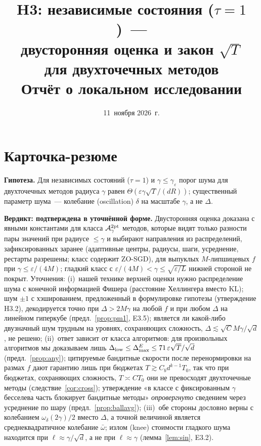 \documentclass[11pt,a4paper]{article}
\title{\textbf{H3: независимые состояния ($\tau=1$)~---\\ двусторонняя оценка и закон $\sqrt T$\\ для двухточечных методов}\\[2pt]
\large Отчёт о локальном исследовании}
\author{}
\date{11~ноября 2026~г.}
\numberwithin{equation}{section}
\theoremstyle{definition}
\theoremstyle{remark}
\newcommand{\Dmax}{\Delta_{\max}}\newcommand{\Dcp}{\Delta_{\rm cp}}\newcommand{\Dlow}{\Delta_{\rm low}}
\newcommand{\wbar}{\bar\omega}\newcommand{\Atwo}{\cA^{\rm 2pt}_\gamma}
\begin{document}
\maketitle
\tableofcontents

\setcounter{section}{-1}
\section{Карточка-резюме}\label{sec:card}
\begin{tcolorbox}[card,title={H3 на одной странице}]
\textbf{Гипотеза.} Для независимых состояний ($\tau=1$) и $\gamma\le\gamma_\varepsilon$ порог шума для двухточечных методов радиуса $\gamma$ равен $\Theta(\varepsilon\gamma\sqrt T/(dR))$; существенный параметр шума~--- колебание (oscillation) $\delta$ на масштабе $\gamma$, а не $\Delta$.

\textbf{Вердикт: подтверждена в уточнённой форме.} Двусторонняя оценка доказана с явными константами для класса $\Atwo$ методов, которые видят только разности пары значений при радиусе $\le\gamma$ и выбирают направления из распределений, зафиксированных заранее (адаптивные центры, радиусы, шаги, усреднение, рестарты разрешены; класс содержит ZO-SGD), для выпуклых $M$-липшицевых $f$ при $\gamma\le\varepsilon/(4M)$; гладкий класс с $\varepsilon/(4M)<\gamma\le\sqrt{\varepsilon/L}$ нижней стороной не покрыт. Уточнения: (i)~нашей технике верхней оценки нужно распределение шума с конечной информацией Фишера (расстояние Хеллингера вместо KL); шум $\pm1$ с хэшированием, предложенный в формулировке гипотезы (утверждение H3.2), декодируется точно при $\Delta>2M\gamma$ на любой $f$ и при любом $\Delta$ на линейном гиперкубе (предл.~\ref{prop:pm1}, E3.5); является ли какой-либо двузначный шум трудным на уровнях, сохраняющих сложность, $\Delta\lesssim\sqrt C M\gamma/\sqrt d$, не решено; (ii)~ответ зависит от класса алгоритмов: для произвольных алгоритмов мы доказываем лишь $\Dlow\le\Dmax^E\le71\,\varepsilon\sqrt T/\sqrt d$ (предл.~\ref{prop:any}); цитируемые бандитные скорости после перенормировки на размах $f$ дают гарантию лишь при бюджетах $T\gtrsim C_bd^{k-1}T_0$, так что при бюджетах, сохраняющих сложность, $T\asymp CT_0$ они не превосходят двухточечные методы (следствие~\ref{cor:cross}); утверждение «в классе с фиксированным $\gamma$ бесселева часть блокирует бандитные методы» \emph{опровергнуто} сведением через усреднение по шару (предл.~\ref{prop:ballavg}); (iii)~обе стороны дословно верны с колебанием $\omega_\delta(2\gamma)/2$ вместо $\Delta$, а точной величиной является среднеквадратичное колебание $\wbar$; излом (knee) стоимости гладкого шума находится при $\ell\approx\gamma/\sqrt d$, а не при $\ell\approx\gamma$ (лемма~\ref{lem:sin}, E3.2).


\end{tcolorbox}
\end{document}
